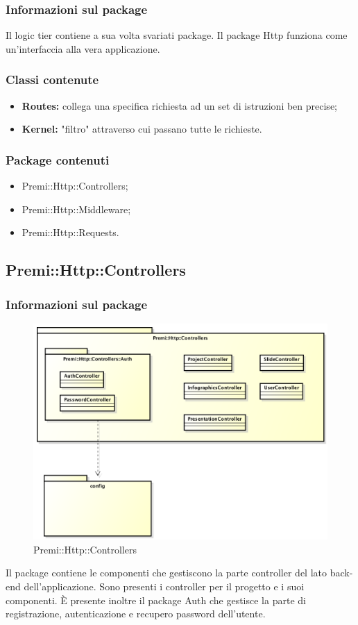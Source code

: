 	\subsubsection*{Informazioni sul package}
	 Il logic tier contiene a sua volta svariati package. Il package Http funziona come un'interfaccia alla vera applicazione.
	 \subsubsection*{Classi contenute}
	 \begin{itemize}
	 	\item \textbf{Routes: }collega una specifica richiesta ad un set di istruzioni ben precise;
	 	\item \textbf{Kernel: }"filtro" attraverso cui passano tutte le richieste.
	 \end{itemize}
	 \subsubsection*{Package contenuti}
		 \begin{itemize}
		 	\item Premi::Http::Controllers;
		 	\item Premi::Http::Middleware;
		 	\item Premi::Http::Requests.
		 \end{itemize}

\newpage
\subsection{Premi::Http::Controllers}
	\subsubsection*{Informazioni sul package}
	\begin{figure}[h]
		\centering
		\includegraphics[width=0.9\linewidth]{img/premi_http_controllers}
		\caption[Premi::Http::Controllers]{Premi::Http::Controllers}
	\end{figure}
	Il package contiene le componenti che gestiscono la parte controller del lato \gls{back-end} dell'applicazione. 
	Sono presenti i controller per il progetto e i suoi componenti. È presente inoltre il package Auth che gestisce la parte di registrazione, autenticazione e recupero password dell'utente. 
	
